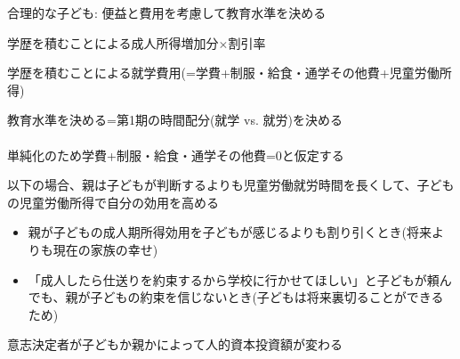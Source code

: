 \begin{frame}{}
合理的な子ども: 便益と費用を考慮して教育水準を決める
\begin{description}
\vspace{1.0ex}\setlength{\itemsep}{1.0ex}\setlength{\baselineskip}{12pt}
\pause
\item[便益]	学歴を積むことによる成人所得増加分$\times$割引率
\pause
\item[費用]	学歴を積むことによる就学費用(=学費+制服・給食・通学その他費+児童労働所得)
\end{description}
\vspace{2ex}
\pause
教育水準を決める=第1期の時間配分(就学 vs. 就労)を決める\\~\\
\pause
単純化のため学費+制服・給食・通学その他費=0と仮定する
\pause
\begin{dinglist}{43}
\vspace{1.0ex}\setlength{\itemsep}{1.0ex}\setlength{\baselineskip}{12pt}
\item	以下の場合、親は子どもが判断するよりも児童労働就労時間を長くして、子どもの児童労働所得で自分の効用を高める
	\begin{itemize}
	\vspace{1.0ex}\setlength{\itemsep}{1.0ex}\setlength{\baselineskip}{12pt}
\pause
	\item	親が子どもの成人期所得効用を子どもが感じるよりも割り引くとき(将来よりも現在の家族の幸せ)
\pause
	\item	「成人したら仕送りを約束するから学校に行かせてほしい」と子どもが頼んでも、親が子どもの約束を信じないとき(子どもは将来裏切ることができるため)
	\end{itemize}
\pause
\item	意志決定者が子どもか親かによって人的資本投資額が変わる
\end{dinglist}
\end{frame}

